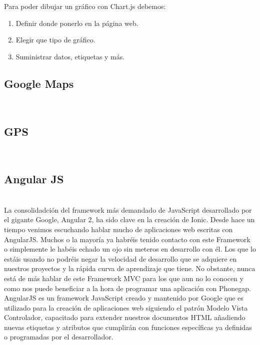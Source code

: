 \documentclass[a4paper, 11pt]{article}
\begin{document}
\begin{itemize}
          Para poder dibujar un gráfico con Chart.js debemos:
          \begin{enumerate}[1.]
            \item Definir donde ponerlo en la página web.
            \item Elegir que tipo de gráfico.
            \item Suministrar datos, etiquetas y más.
          \end{enumerate}


        \subsection{Google Maps}\\

        \subsection{GPS}\\

        \subsection{Angular JS}\\

            La consolidadción del framework más demandado de JavaScript desarrollado
            por el gigante Google, Angular 2, ha sido clave en la creación de Ionic.
            Desde hace un tiempo venimos escuchando hablar mucho de aplicaciones web
            escritas con AngularJS. Muchos o la mayoría ya habréis tenido contacto
            con este Framework o simplemente le habéis echado un ojo sin meteros en
            desarrollo con él. Los que lo estáis usando no podréis negar la
            velocidad de desarrollo que se adquiere en nuestros proyectos y la
            rápida curva de aprendizaje que tiene. No obstante, nunca está de más
            hablar de este Framework MVC para los que aun no lo conocen y como nos
            puede beneficiar a la hora de programar una aplicación con Phonegap.\\

            AngularJS es un framework JavaScript creado y mantenido por Google que es
            utilizado para la creación de aplicaciones web siguiendo el patrón Modelo
            Vista Controlador, capacitado para extender nuestros documentos HTML
            añadiendo nuevas etiquetas y atributos que cumplirán con funciones
            específicas ya definidas o programadas por el desarrollador.\\


\end{itemize}
\end{document}
